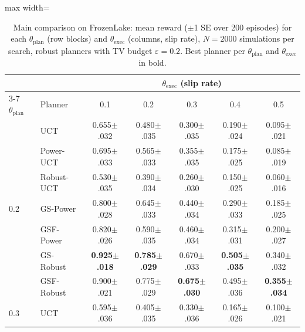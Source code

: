 \begin{table}[t]
\centering
\small
\caption{Main comparison on FrozenLake: mean reward ($\pm$1 SE over 200 episodes) for each $\theta_{\text{plan}}$ (row blocks) and $\theta_{\text{exec}}$ (columns, slip rate), $N = 2000$ simulations per search, robust planners with TV budget $\varepsilon = 0.2$. Best planner per $\theta_{\text{plan}}$ and $\theta_{\text{exec}}$ in bold.}
\label{tab:main-frozen-lake}
\begin{adjustbox}{max width=\linewidth}
\begin{tabular}{llccccc}
\toprule
 & & \multicolumn{5}{c}{$\theta_{\text{exec}}$ (slip rate)} \\
\cmidrule(l){3-7}
$\theta_{\text{plan}}$ & Planner & 0.1 & 0.2 & 0.3 & 0.4 & 0.5 \\
\midrule
\multirow{7}{*}{0.2} & UCT & 0.655{\scriptsize$\pm$.032} & 0.480{\scriptsize$\pm$.035} & 0.300{\scriptsize$\pm$.035} & 0.190{\scriptsize$\pm$.024} & 0.095{\scriptsize$\pm$.021} \\
 & Power-UCT & 0.695{\scriptsize$\pm$.033} & 0.565{\scriptsize$\pm$.033} & 0.355{\scriptsize$\pm$.035} & 0.175{\scriptsize$\pm$.025} & 0.085{\scriptsize$\pm$.019} \\
 & Robust-UCT & 0.530{\scriptsize$\pm$.035} & 0.390{\scriptsize$\pm$.034} & 0.260{\scriptsize$\pm$.030} & 0.150{\scriptsize$\pm$.025} & 0.060{\scriptsize$\pm$.016} \\
 & GS-Power & 0.800{\scriptsize$\pm$.028} & 0.645{\scriptsize$\pm$.033} & 0.440{\scriptsize$\pm$.034} & 0.290{\scriptsize$\pm$.033} & 0.185{\scriptsize$\pm$.025} \\
 & GSF-Power & 0.820{\scriptsize$\pm$.026} & 0.590{\scriptsize$\pm$.035} & 0.460{\scriptsize$\pm$.034} & 0.315{\scriptsize$\pm$.031} & 0.200{\scriptsize$\pm$.027} \\
 & GS-Robust & \textbf{0.925{\scriptsize$\pm$.018}} & \textbf{0.785{\scriptsize$\pm$.029}} & 0.670{\scriptsize$\pm$.033} & \textbf{0.505{\scriptsize$\pm$.035}} & 0.340{\scriptsize$\pm$.032} \\
 & GSF-Robust & 0.900{\scriptsize$\pm$.021} & 0.775{\scriptsize$\pm$.029} & \textbf{0.675{\scriptsize$\pm$.030}} & 0.495{\scriptsize$\pm$.036} & \textbf{0.355{\scriptsize$\pm$.034}} \\
\midrule
\multirow{7}{*}{0.3} & UCT & 0.595{\scriptsize$\pm$.036} & 0.405{\scriptsize$\pm$.035} & 0.330{\scriptsize$\pm$.036} & 0.165{\scriptsize$\pm$.026} & 0.100{\scriptsize$\pm$.021} \\

\end{tabular}
\end{adjustbox}
\end{table}
